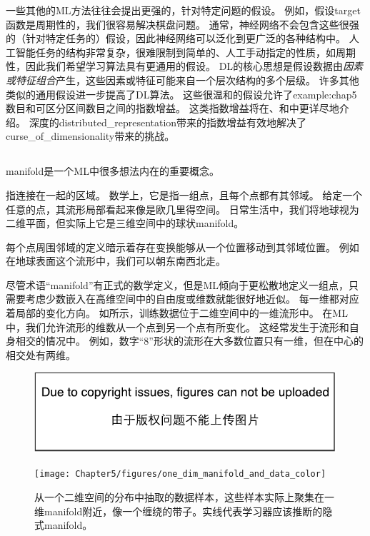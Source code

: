 一些其他的\gls{ML}方法往往会提出更强的，针对特定问题的假设。
例如，假设\gls{target}函数是周期性的，我们很容易解决棋盘问题。
通常，神经网络不会包含这些很强的（针对特定任务的）假设，因此神经网络可以泛化到更广泛的各种结构中。
人工智能任务的结构非常复杂，很难限制到简单的、人工手动指定的性质，如周期性，因此我们希望学习算法具有更通用的假设。
\gls{DL}的核心思想是假设数据由\emph{因素或特征组合}产生，这些因素或特征可能来自一个层次结构的多个层级。
许多其他类似的通用假设进一步提高了\gls{DL}算法。
这些很温和的假设允许了\gls{example:chap5}数目和可区分区间数目之间的指数增益。
这类指数增益将在、和中更详尽地介绍。
深度的\gls{distributed_representation}带来的指数增益有效地解决了\gls{curse_of_dimensionality}带来的挑战。


\subsection{}
\label{sec:manifold_learning}
\gls{manifold}是一个\gls{ML}中很多想法内在的重要概念。

指连接在一起的区域。
数学上，它是指一组点，且每个点都有其邻域。
给定一个任意的点，其流形局部看起来像是欧几里得空间。
日常生活中，我们将地球视为二维平面，但实际上它是三维空间中的球状\gls{manifold}。

每个点周围邻域的定义暗示着存在变换能够从一个位置移动到其邻域位置。
例如在地球表面这个流形中，我们可以朝东南西北走。

尽管术语``\gls{manifold}''有正式的数学定义，但是\gls{ML}倾向于更松散地定义一组点，只需要考虑少数嵌入在高维空间中的自由度或维数就能很好地近似。
每一维都对应着局部的变化方向。
如所示，训练数据位于二维空间中的一维流形中。
在\gls{ML}中，我们允许流形的维数从一个点到另一个点有所变化。
这经常发生于流形和自身相交的情况中。
例如，数字``8''形状的流形在大多数位置只有一维，但在中心的相交处有两维。

\begin{figure}[!htb]
\ifOpenSource
\centerline{\includegraphics{figure.pdf}}
\else
\centerline{\texttt{[image: Chapter5/figures/one\_dim\_manifold\_and\_data\_color]}}
\fi
\caption{从一个二维空间的分布中抽取的数据样本，这些样本实际上聚集在一维\gls{manifold}附近，像一个缠绕的带子。实线代表学习器应该推断的隐式\gls{manifold}。}
\label{fig:chap5_one_dim_manifold_and_data}
\end{figure}

